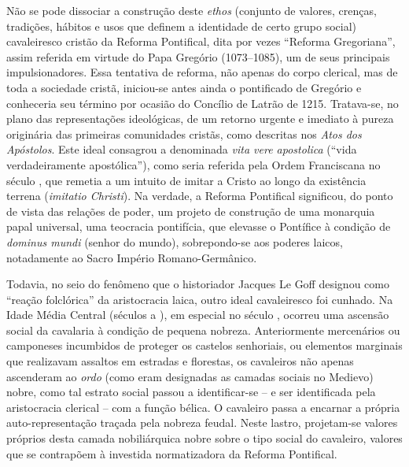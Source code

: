 Não se pode dissociar a construção deste \textit{ethos} (conjunto de valores,
crenças, tradições, hábitos e usos que definem a identidade de certo grupo
social) cavaleiresco cristão da Reforma Pontifical, dita por vezes “Reforma
Gregoriana”, assim referida em virtude do Papa Gregório  (1073--1085), um de
seus principais impulsionadores. Essa tentativa de reforma, não apenas do corpo
clerical, mas de toda a sociedade cristã, iniciou-se antes ainda o pontificado
de Gregório  e conheceria seu término por ocasião do  Concílio de Latrão
de 1215. Tratava-se, no plano das representações ideológicas, de um retorno
urgente e imediato à pureza originária das primeiras comunidades cristãs, como
descritas nos \textit{Atos dos Apóstolos}. Este ideal consagrou a denominada
\textit{vita vere apostolica} (“vida verdadeiramente apostólica”), como seria
referida pela Ordem Franciscana no século , que remetia a um intuito de
imitar a Cristo ao longo da existência terrena (\textit{imitatio Christi}). Na
verdade, a Reforma Pontifical significou, do ponto de vista das relações de
poder, um projeto de construção de uma monarquia papal universal, uma teocracia
pontifícia, que elevasse o Pontífice à condição de \textit{dominus mundi}
(senhor do mundo), sobrepondo-se aos poderes laicos, notadamente ao Sacro
Império Romano-Germânico. 

Todavia, no seio do fenômeno que o historiador Jacques Le Goff designou como
“reação folclórica” da aristocracia laica, outro ideal cavaleiresco foi
cunhado. Na Idade Média Central (séculos  a ), em especial no século
, ocorreu uma ascensão social da cavalaria à condição de pequena nobreza.
Anteriormente mercenários ou camponeses incumbidos de proteger os castelos
senhoriais, ou elementos marginais que realizavam assaltos em estradas e
florestas, os cavaleiros não apenas ascenderam ao \textit{ordo} (como eram
designadas as camadas sociais no Medievo) nobre, como tal estrato social passou
a identificar-se -- e ser identificada pela aristocracia clerical -- com a função
bélica. O cavaleiro passa a encarnar a própria auto-representação traçada pela
nobreza feudal. Neste lastro, projetam-se valores próprios desta camada
nobiliárquica nobre sobre o tipo social do cavaleiro, valores que se contrapõem
à investida normatizadora da Reforma Pontifical. 

